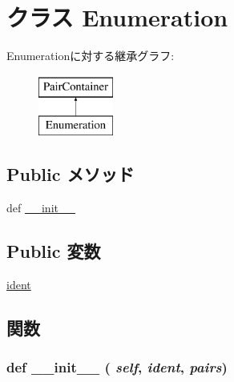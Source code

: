 \hypertarget{classslicc_1_1symbols_1_1Type_1_1Enumeration}{
\section{クラス Enumeration}
\label{classslicc_1_1symbols_1_1Type_1_1Enumeration}
}
Enumerationに対する継承グラフ:\begin{figure}[H]
\begin{center}
\leavevmode
\includegraphics[height=2cm]{classslicc_1_1symbols_1_1Type_1_1Enumeration}
\end{center}
\end{figure}
\subsection*{Public メソッド}
\begin{DoxyCompactItemize}
\item 
def \hyperlink{classslicc_1_1symbols_1_1Type_1_1Enumeration_ac775ee34451fdfa742b318538164070e}{\_\-\_\-init\_\-\_\-}
\end{DoxyCompactItemize}
\subsection*{Public 変数}
\begin{DoxyCompactItemize}
\item 
\hyperlink{classslicc_1_1symbols_1_1Type_1_1Enumeration_a2fe57e2d3d2cba9a3aeba2f629eaa78b}{ident}
\end{DoxyCompactItemize}


\subsection{関数}
\hypertarget{classslicc_1_1symbols_1_1Type_1_1Enumeration_ac775ee34451fdfa742b318538164070e}{
\subsubsection[{\_\-\_\-init\_\-\_\-}]{\setlength{\rightskip}{0pt plus 5cm}def \_\-\_\-init\_\-\_\- ( {\em self}, \/   {\em ident}, \/   {\em pairs})}}
\label{classslicc_1_1symbols_1_1Type_1_1Enumeration_ac775ee34451fdfa742b318538164070e}



